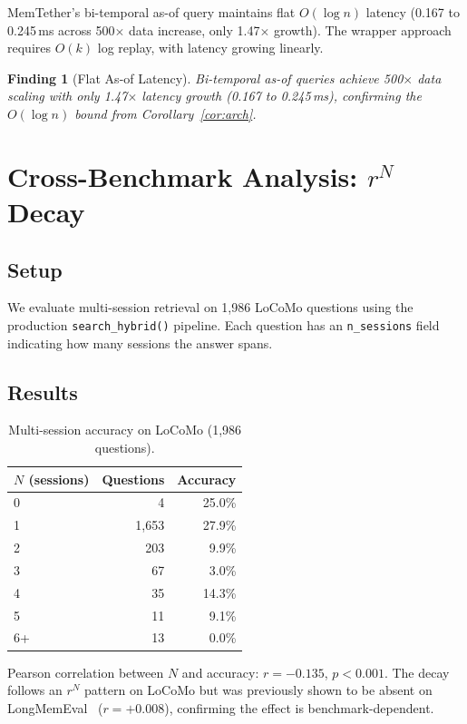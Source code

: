 \documentclass{article}
\newtheorem{finding}{Finding}
\begin{document}
MemTether's bi-temporal as-of query maintains flat $O(\log n)$ latency (0.167 to 0.245\,ms across 500$\times$ data increase, only 1.47$\times$ growth). The wrapper approach requires $O(k)$ log replay, with latency growing linearly.

\begin{finding}[Flat As-of Latency]
Bi-temporal as-of queries achieve 500$\times$ data scaling with only 1.47$\times$ latency growth (0.167 to 0.245\,ms), confirming the $O(\log n)$ bound from Corollary~\ref{cor:arch}.
\end{finding}

\section{Cross-Benchmark Analysis: $r^N$ Decay}
\label{sec:locomo}

\subsection{Setup}
We evaluate multi-session retrieval on 1{,}986 LoCoMo questions using the production \texttt{search\_hybrid()} pipeline. Each question has an \texttt{n\_sessions} field indicating how many sessions the answer spans.

\subsection{Results}

\begin{table}[h]
\centering
\caption{Multi-session accuracy on LoCoMo (1{,}986 questions).}
\begin{tabular}{lrr}
\toprule
$N$ (sessions) & Questions & Accuracy \\
\midrule
0 & 4 & 25.0\% \\
1 & 1{,}653 & 27.9\% \\
2 & 203 & 9.9\% \\
3 & 67 & 3.0\% \\
4 & 35 & 14.3\% \\
5 & 11 & 9.1\% \\
6+ & 13 & 0.0\% \\
\bottomrule
\end{tabular}
\label{tab:locomo}
\end{table}

Pearson correlation between $N$ and accuracy: $r = -0.135$, $p < 0.001$. The decay follows an $r^N$ pattern on LoCoMo but was previously shown to be absent on LongMemEval~\citep{memtether} ($r = +0.008$), confirming the effect is benchmark-dependent.
\end{document}
